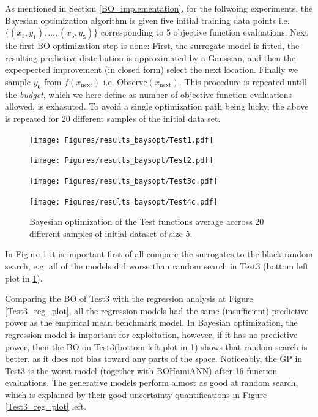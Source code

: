 As mentioned in Section \ref{BO_implementation}, for the follwoing experiments, the Bayesian
optimization algorithm is given five initial training data points i.e. $\{(x_1, y_1), \dots, (x_5,
y_5)\}$ corresponding to 5 objective function evaluations. Next the first BO optimization step is
done: First, the surrogate model is fitted, the resulting predictive distribution is approximated by
a Gaussian, and then the expecpected improvement (in closed form) select the next location. Finally
we sample $y_6$ from $f(x_{\text{next}})$ i.e. $\text{Observe}(x_{\text{next}})$. This procedure is
repeated untill the \textit{budget}, which we here define as number of objective function
evaluations allowed, is exhasuted. To avoid a single optimization path being lucky, the above is
repeated for 20 different samples of the initial data set. 
\begin{figure}[H]
  \centering
  \begin{minipage}[b]{0.49\textwidth}
   \texttt{[image: Figures/results\_baysopt/Test1.pdf]}
  \end{minipage}
  \hfill
  \begin{minipage}[b]{0.49\textwidth}
    \texttt{[image: Figures/results\_baysopt/Test2.pdf]}
   \end{minipage}
   \begin{minipage}[b]{0.49\textwidth}
    \texttt{[image: Figures/results\_baysopt/Test3c.pdf]}
   \end{minipage}
   \hfill
   \begin{minipage}[b]{0.49\textwidth}
     \texttt{[image: Figures/results\_baysopt/Test4c.pdf]}
    \end{minipage}
  \caption{Bayesian optimization of the Test functions average accross 20 different samples of initial dataset of size 5.}
  \label{Test_bayesOpt}
\end{figure}
In Figure \ref{Test_bayesOpt} it is important first of all compare the surrogates to the black random search, e.g.
all of the models did worse than random search in Test3 (bottom left plot in \ref{Test_bayesOpt}).

Comparing the BO of Test3 with the regression analysis at Figure \ref{Test3_reg_plot}, all the
regression models had the same (insufficient) predictive power as the empirical mean benchmark
model. In Bayesian optimization, the regression model is important for exploitation, however, if it
has no predictive power, then the BO on Test3(bottom left plot in \ref{Test_bayesOpt}) shows that
random search is better, as it does not bias toward any parts of the space. Noticeably, the GP in
Test3 is the worst model (together with BOHamiANN) after 16 function evaluations. The generative
models perform almost as good at random search, which is explained by their good uncertainty
quantifications in Figure \ref{Test3_reg_plot} left.

